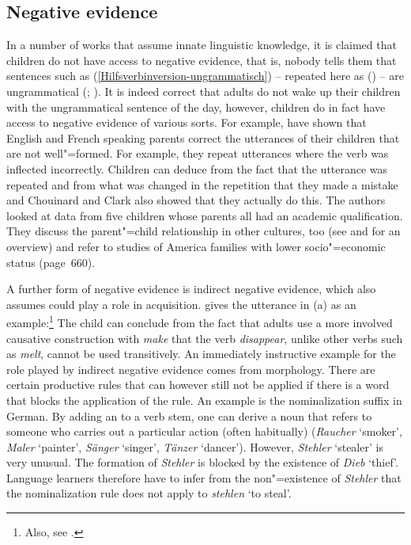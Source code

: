 \subsection{Negative evidence}
\label{Abschnitt-negative-Evidenz}

In a number of works that assume innate linguistic knowledge, it is claimed that children do not have access to negative evidence, that is,
nobody tells them that sentences such as (\ref{Hilfsverbinversion-ungrammatisch}) -- repeated here as ()
-- are ungrammatical (\citealp[--52]{BH70a}; \citealp{Marcus93a}). 
\z
It is indeed correct that adults do not wake up their children with the ungrammatical sentence of the day, however, children do in fact have access
to negative evidence of various sorts. For example, \citet{CC2003a} have shown that English and French speaking parents
correct the utterances of their children that are not well"=formed.
For example, they repeat utterances where the verb was inflected incorrectly. Children can deduce from the fact that the utterance was repeated and from what was changed
in the repetition that they made a mistake and Chouinard and Clark also showed that they actually do this. The authors looked at data from five children whose
parents all had an academic qualification. They discuss the parent"=child relationship in other cultures, too (see  and 
for an overview) and refer to studies of America families with lower socio"=economic status (page~660). 

A further form of negative evidence is indirect negative evidence, which \citet[]{Chomsky81a} also assumes could play a role
in acquisition. \citet[Section~5.2]{Goldberg95a} gives the utterance in (a) as an example:\footnote{%
Also, see .
}
\eal
{}
\zl
The child can conclude from the fact that adults use a more involved causative construction with \emph{make}
that the verb \emph{disappear}, unlike other verbs such as \emph{melt}, cannot be used transitively. 
An immediately instructive example for the role played by indirect negative evidence comes from morphology.
There are certain productive rules that can however still not be applied if there is a word that blocks
the application of the rule. An example is the  nominalization suffix in German.
By adding an  to a verb stem, one can derive a noun that refers to someone who carries out a particular
action (often habitually) (\emph{Raucher} `smoker', \emph{Maler} `painter', \emph{Sänger} `singer', \emph{Tänzer} `dancer').
However, \emph{Stehler} `stealer' is very unusual. The formation of \emph{Stehler} is blocked by the existence of \emph{Dieb} `thief'.
Language learners therefore have to infer from the non"=existence of \emph{Stehler} that the nominalization rule does not apply to \emph{stehlen} `to steal'.

